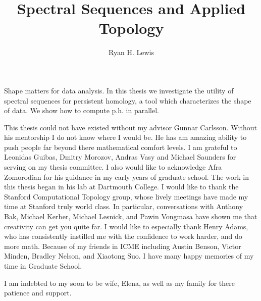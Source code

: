 \documentclass[12pt,twsoside]{report}
\title{Spectral Sequences and Applied Topology}
\author{Ryan H. Lewis}
\begin{document}
\maketitle

%
Shape matters for data analysis. In this thesis we investigate the utility of spectral sequences for persistent homology, a tool which characterizes the shape of data. We show how to compute p.h. in parallel. 


This thesis could not have existed without my advisor Gunnar Carlsson. Without his mentorship I do not know where I would be. He has am amazing ability to push people far beyond there mathematical comfort levels. I am grateful to Leonidas Guibas, Dmitry Morozov, Andras Vasy and Michael Saunders for serving on my thesis committee. I also would like to acknowledge Afra Zomorodian for his guidance in my early years of graduate school. The work in this thesis began in his lab at Dartmouth College. I would like to thank the Stanford Computational Topology group, whose lively meetings have made my time at Stanford truly world class. In particular, conversations with Anthony Bak, Michael Kerber, Michael Lesnick, and Pawin Vongmasa have shown me that creativity can get you quite far. I would like to especially thank Henry Adams, who has consistently instilled me with the confidence to work harder, and do more math. Because of my friends in ICME including Austin Benson, Victor Minden, Bradley Nelson, and Xiaotong Suo. I have many happy memories of my time in Graduate School. 

I am indebted to my soon to be wife, Elena, as well as my family for there patience and support.

 \afterpreface
%







% 
\end{document}
